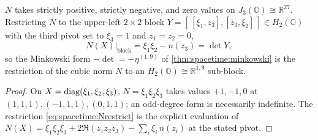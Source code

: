 \begin{theorem}
\label{thm:spacetime:Nindef}
$N$ takes strictly positive, strictly negative, and zero values on
$J_3(\mathbb O)\cong\mathbb R^{27}$. Restricting $N$ to the upper-left $2\times2$ block
$Y=[\,[\xi_1,z_3],[\bar z_3,\xi_2]\,]\in H_2(\mathbb O)$ with the third pivot set to
$\xi_3=1$ and $z_1=z_2=0$,
\begin{equation}\label{eq:spacetime:Nrestrict}
  N(X)\big|_{\mathrm{block}}=\xi_1\xi_2-n(z_3)=\det Y,
\end{equation}
so the Minkowski form $-\det=-\eta^{(1,9)}$ of \autoref{thm:spacetime:minkowski} is the
restriction of the cubic norm $N$ to an $H_2(\mathbb O)\cong\mathbb R^{1,9}$ sub-block.
\end{theorem}
\begin{proof}
On $X=\operatorname{diag}(\xi_1,\xi_2,\xi_3)$, $N=\xi_1\xi_2\xi_3$ takes values $+1,-1,0$ at
$(1,1,1),(-1,1,1),(0,1,1)$; an odd-degree form is necessarily indefinite. The
restriction \eqref{eq:spacetime:Nrestrict} is the explicit evaluation of
$N(X)=\xi_1\xi_2\xi_3+2\Re(z_1z_2z_3)-\sum_i\xi_i\,n(z_i)$ at the stated pivot.
\end{proof}

